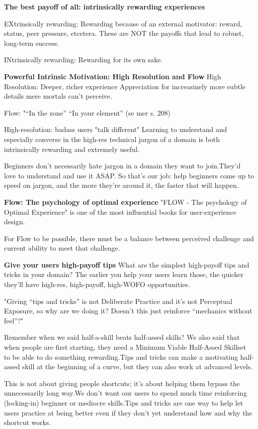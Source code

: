 \textbf{The best payoff of all: intrinsically rewarding experiences}

EXtrinsically rewarding: Rewarding because of an external motivator: reward, status, peer pressure, etcetera. These are NOT the payoffs that lead to robust, long-term success.

INtrinsically rewarding: Rewarding for its own sake.

\textbf{Powerful Intrinsic Motivation:
High Resolution and Flow}
High Resolution: Deeper, richer experience
Appreciation for increasinely more subtle details mere mortals can’t perceive.

Flow: "“In the zone”
“In your element” (se mer s. 208)

High-resolution: badass users "talk different"
Learning to understand and especially converse in the high-res technical jargon of a domain is both intrinsically rewarding and extremely useful.

Beginners don’t necessarily hate jargon in a domain they want to join.They’d love to understand and use it ASAP. So that’s our job: help beginners come up to speed on jargon, and the more they’re around it, the faster that will happen.

\textbf{Flow: The psychology of optimal experience}
"FLOW - The psychology of Optimal Experience" is one of the most influential books for user-experience design.

For Flow to be possible, there must be a balance between perceived challenge and current ability to meet that challenge.

\textbf{Give your users high-payoff tips}
What are the simplest high-payoff tips and tricks in your domain? The earlier you help your users learn those, the quicker they’ll have high-res, high-payoff, high-WOFO opportunities.

"Giving “tips and tricks” is not Deliberate Practice and it’s not Perceptual Exposure, so why are we doing it? Doesn’t this just reinforce “mechanics without feel”?"

Remember when we said half-a-skill beats half-assed skills?
We also said that when people are first starting, they need a Minimum Viable Half-Assed Skillset to be able to do something rewarding.Tips and tricks can make a motivating half-assed skill at the beginning of a curve, but they can also work at advanced levels.

This is not about giving people shortcuts; it’s about helping them bypass the unnecessarily long way.We don’t want our users to spend much time reinforcing (locking-in) beginner or mediocre skills.Tips and tricks are one way to help let users practice at being better even if they don’t yet understand how and why the shortcut works.

